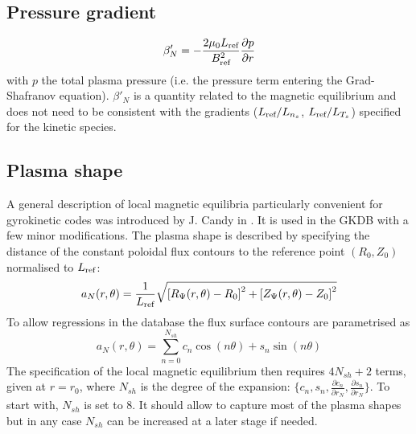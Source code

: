 \documentclass[fleqn]{report}
\begin{document}
\subsection{Pressure gradient}
$$\beta'_N = -\frac{2\mu_0 L_{\textrm{ref}}}{B_{\textrm{ref}}^2 }\frac{\partial p}{\partial r}$$
with $p$ the total plasma pressure (i.e. the pressure term entering the Grad-Shafranov equation). $\beta'_N$ is a quantity related to the magnetic equilibrium and does not need to be consistent with the gradients ($L_{\textrm{ref}}/L_{n_s}$, $L_{\textrm{ref}}/L_{T_s}$) specified for the kinetic species. 

\subsection{Plasma shape}
A general description of local magnetic equilibria particularly convenient for gyrokinetic codes was introduced by J. Candy in \cite {Candy:PPCF2009}. It is used in the GKDB with a few minor modifications.
The plasma shape is described by specifying the distance of the constant poloidal flux contours to the reference point $(R_0,Z_0)$  normalised to $L_{\textrm{ref}}$:
\begin{equation}
 a_N(r,\theta) = \frac{1}{L_{\textrm{ref}}}\sqrt{\left[R_{\Psi}(r,\theta)-R_0\right]^2 + \left[Z_{\Psi}(r,\theta)-Z_0\right]^2}
\end{equation}
To allow regressions in the database the flux surface contours are parametrised as 
\begin{equation}
 a_N(r,\theta) = \sum_{n=0}^{N_{sh}} c_n \cos(n\theta) + s_n \sin(n\theta)
\end{equation}
The specification of the local magnetic equilibrium then requires $4N_{sh}+2$ terms, given at $r=r_0$, where $N_{sh}$ is the degree of the expansion: $\{c_n,s_n,\frac{\partial c_n}{\partial r_N},\frac{\partial s_n}{\partial r_N}\}$. To start with, $N_{sh}$ is set to 8. It should allow to capture most of the plasma shapes but in any case $N_{sh}$ can be increased at a later stage if needed.\\
\end{document}
